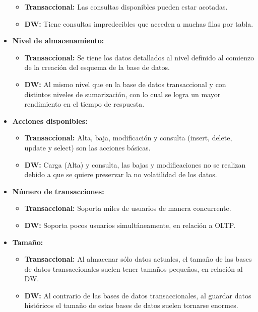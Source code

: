 \documentclass[a4paper,11pt]{article}
\begin{document}
\begin{itemize}
\begin{itemize}
          \item \textbf{Transaccional:} Las consultas disponibles pueden estar acotadas.
          \item \textbf{DW:} Tiene consultas impredecibles que acceden a muchas filas por tabla.
        \end{itemize}
      \item \textbf{Nivel de almacenamiento:}
        \begin{itemize}
          \item \textbf{Transaccional:} Se tiene los datos detallados al nivel definido al comienzo de la creación del esquema de la base de datos.
          \item \textbf{DW:} Al mismo nivel que en la base de datos transaccional y con distintos niveles de sumarización, con lo cual se logra un mayor
          rendimiento en el tiempo de respuesta.
        \end{itemize}
      \item \textbf{Acciones disponibles:}
        \begin{itemize}
          \item \textbf{Transaccional:} Alta, baja, modificación y consulta (insert, delete, update y select) son las acciones básicas.
          \item \textbf{DW:} Carga (Alta) y consulta, las bajas y modificaciones no se realizan debido a que se quiere preservar la no volatilidad de los
          datos.
        \end{itemize}
      \item \textbf{Número de transacciones:}
        \begin{itemize}
          \item \textbf{Transaccional:} Soporta miles de usuarios de manera concurrente.
          \item \textbf{DW:} Soporta pocos usuarios simultáneamente, en relación a  OLTP.
        \end{itemize}
      \item \textbf{Tamaño:}
        \begin{itemize}
          \item \textbf{Transaccional:} Al almacenar sólo datos actuales, el tamaño de las bases de datos transaccionales suelen tener tamaños pequeños,
          en relación al DW.
          \item \textbf{DW:} Al contrario de las bases de datos transaccionales, al guardar datos históricos el tamaño de estas bases de datos suelen
          tornarse enormes.

\end{itemize}
\end{itemize}
\end{document}
